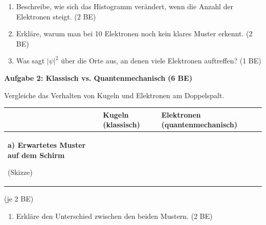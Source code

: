 \documentclass[11pt,a4paper]{article}
\begin{document}
\begin{enumerate}[label=\alph*)]
\item Beschreibe, wie sich das Histogramm verändert, wenn die Anzahl der Elektronen steigt. \hfill (2 BE)

\vspace{1.2cm}

\item Erkläre, warum man bei 10 Elektronen noch kein klares Muster erkennt. \hfill (2 BE)

\vspace{1.2cm}

\item Was sagt $|\psi|^2$ über die Orte aus, an denen viele Elektronen auftreffen? \hfill (1 BE)

\vspace{0.8cm}

\end{enumerate}

\newpage


{\large\textbf{Aufgabe 2: Klassisch vs. Quantenmechanisch}} \hfill \textbf{(6 BE)}

\vspace{0.5em}

Vergleiche das Verhalten von Kugeln und Elektronen am Doppelspalt.

\vspace{0.5em}

\begin{tabularx}{\textwidth}{|p{3.5cm}|X|X|}
\hline
\rowcolor{physiklight}
& \textbf{Kugeln (klassisch)} & \textbf{Elektronen (quantenmechanisch)} \\
\hline
\textbf{a) Erwartetes Muster auf dem Schirm}

\vspace{0.3em}
{\small (Skizze)}

\vspace{2.5cm}

& & \\
\hline
\end{tabularx}

\hfill {\small (je 2 BE)}

\vspace{0.8em}

\begin{enumerate}[label=\alph*), start=2]
\item Erkläre den Unterschied zwischen den beiden Mustern. \hfill (2 BE)

\vspace{2cm}

\end{enumerate}
\end{document}
